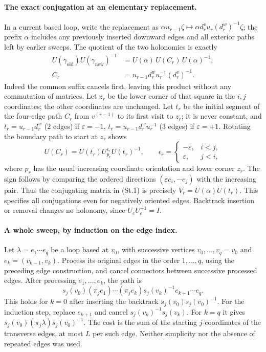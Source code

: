 \documentclass[11pt,a4paper]{article}
\theoremstyle{plain}
\theoremstyle{definition}
\theoremstyle{remark}
\numberwithin{equation}{section}
\begin{document}
\paragraph{The exact conjugation at an elementary replacement.}
In a current based loop, write the replacement as
$\alpha u_{r-1}\zeta\mapsto\alpha d_r^v u_r(d_r^w)^{-1}\zeta$; the prefix $\alpha$ includes any previously inserted
downward edges and all exterior paths left by earlier sweeps. The quotient of the two holonomies is exactly
\begin{equation*}\tag{St.1}\label{eq:St-replacement}
\begin{aligned}
U(\gamma_{\mathrm{old}})U(\gamma_{\mathrm{new}})^{-1}
&=U(\alpha)\,U(C_r)\,U(\alpha)^{-1},\\
C_r&=u_{r-1}d_r^w u_r^{-1}(d_r^v)^{-1}.
\end{aligned}
\end{equation*}
Indeed the common suffix cancels first, leaving this product without any commutation of matrices.
Let $z_r$ be the lower corner of that square in the $i,j$ coordinates; the other coordinates are unchanged.
Let $t_r$ be the initial segment of the four-edge path $C_r$ from $v^{(r-1)}$ to its first visit to $z_r$; it is never constant, and $t_r=u_{r-1}d_r^w$ ($2$ edges) if $\varepsilon=-1$, $t_r=u_{r-1}d_r^w u_r^{-1}$ ($3$ edges) if $\varepsilon=+1$.
Rotating the boundary path to start at $z_r$ shows
\[
U(C_r)=U(t_r)U_{p_r}^{\epsilon_r}U(t_r)^{-1},\qquad
\epsilon_r=\begin{cases}-\varepsilon,&i<j,\\ \varepsilon,&j<i,\end{cases}
\]
where $p_r$ has the usual increasing coordinate orientation and lower corner $z_r$.
The sign follows by comparing the ordered directions $(\varepsilon e_i,-e_j)$ with the increasing pair.
Thus the conjugating matrix in (St.1) is precisely $V_r=U(\alpha)U(t_r)$.
This specifies all conjugations even for negatively oriented edges.
Backtrack insertion or removal changes no holonomy, since $U_eU_e^{-1}=I$.

\paragraph{A whole sweep, by induction on the edge index.}
Let $\lambda=e_1\cdots e_q$ be a loop based at $v_0$, with successive vertices $v_0,\ldots,v_q=v_0$ and $e_k=(v_{k-1},v_k)$.
Process its original edges in the order $1,\ldots,q$, using the preceding edge construction, and cancel connectors between
successive processed edges. After processing $e_1,\ldots,e_k$, the path is
\[
s_j(v_0)(\pi_je_1)\cdots(\pi_je_k)s_j(v_k)^{-1}e_{k+1}\cdots e_q.
\]
This holds for $k=0$ after inserting the backtrack $s_j(v_0)s_j(v_0)^{-1}$.
For the induction step, replace $e_{k+1}$ and cancel $s_j(v_k)^{-1}s_j(v_k)$.
For $k=q$ it gives $s_j(v_0)(\pi_j\lambda)s_j(v_0)^{-1}$.
The cost is the sum of the starting $j$-coordinates of the transverse edges, at most $L$ per such edge.
Neither simplicity nor the absence of repeated edges was used.
\end{document}
